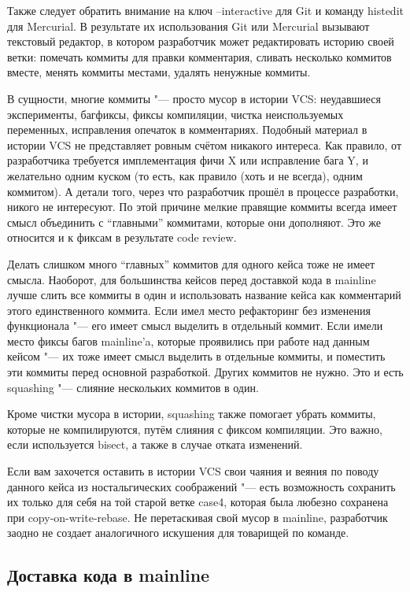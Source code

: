 \documentclass[10pt, a5paper]{article}
\begin{document}
Также следует обратить внимание на ключ --interactive для Git и команду histedit для Mercurial. В результате их использования Git или Mercurial вызывают текстовый редактор, в котором разработчик может редактировать историю своей ветки: помечать коммиты для правки комментария, сливать несколько коммитов вместе, менять коммиты местами, удалять ненужные коммиты.

В сущности, многие коммиты "--- просто мусор в истории VCS: неудавшиеся эксперименты, багфиксы, фиксы компиляции, чистка неиспользуемых переменных, исправления опечаток в комментариях. Подобный материал в истории VCS не представляет ровным счётом никакого интереса. Как правило, от разработчика требуется имплементация фичи X или исправление бага Y, и желательно одним куском (то есть, как правило (хоть и не всегда), одним коммитом). А детали того, через что разработчик прошёл в процессе разработки, никого не интересуют. По этой причине мелкие правящие коммиты всегда имеет смысл объединить с ``главными'' коммитами, которые они дополняют. Это же относится и к фиксам в результате code review.

Делать слишком много ``главных'' коммитов для одного кейса тоже не имеет смысла. Наоборот, для большинства кейсов перед доставкой кода в mainline лучше слить все коммиты в один и использовать название кейса как комментарий этого единственного коммита. Если имел место рефакторинг без изменения функционала "--- его имеет смысл выделить в отдельный коммит. Если имели место фиксы багов mainline'a, которые проявились при работе над данным кейсом "--- их тоже имеет смысл выделить в отдельные коммиты, и поместить эти коммиты перед основной разработкой. Других коммитов не нужно. Это и есть squashing "--- слияние нескольких коммитов в один.

Кроме чистки мусора в истории, squashing также помогает убрать коммиты, которые не компилируются, путём слияния с фиксом компиляции. Это важно, если  используется bisect, а также в случае отката изменений.

Если вам захочется оставить в истории VCS свои чаяния и веяния по поводу данного кейса из ностальгических соображений "--- есть возможность сохранить их только для себя на той старой ветке case4, которая была любезно сохранена при copy-on-write-rebase. Не перетаскивая свой мусор в mainline, разработчик заодно не создает аналогичного искушения для товарищей по команде.

\subsection*{Доставка кода в mainline}
\end{document}
